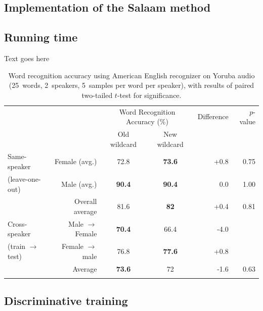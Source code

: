 \documentclass[11pt]{article}
\begin{document}
\subsection{Implementation of the Salaam method}
\label{sec:implementation}
\cite{Qiao10}

\subsection{Running time}
\label{sec:runningtime}

Text goes here

\begin{table}[tb]
\begin{center}

\begin{tabular}{lrccrr}
 &  & \multicolumn{2}{c}{Word Recognition Accuracy (\%)} & Difference & $p$-value \\
\cmidrule(rl){3-4}
& & Old wildcard & New wildcard & &  \\
\midrule
\addlinespace
Same-speaker & Female (avg.) & 72.8 & \textbf{73.6} &+0.8 & 0.75 \\
(leave-one-out)		& Male (avg.) & \textbf{90.4} & \textbf{90.4} & 0.0 & 1.00 \\
			& Overall average & 81.6 & \textbf{82} &  +0.4 & 0.81 \\
\addlinespace
\addlinespace

\addlinespace
Cross-speaker	&Male $\rightarrow$ Female & \textbf{70.4} & 66.4 & -4.0 & \\
(train $\rightarrow$ test)		& Female $\rightarrow$ male & 76.8 & \textbf{77.6}& +0.8	&  \\
			&Average & \textbf{73.6} & 72 	&-1.6	& 0.63 \\
\addlinespace
\midrule
\end{tabular}
\end{center}
\caption{Word recognition accuracy using American English recognizer on Yoruba audio (25~words, 2~speakers, 5~samples per word per speaker), with results of paired two-tailed $t$-test for significance.\label{tab:accuracy}}
\end{table}



\subsection{Discriminative training}
\label{sec:discrimtrain}
\cite{Chan12}
\end{document}
